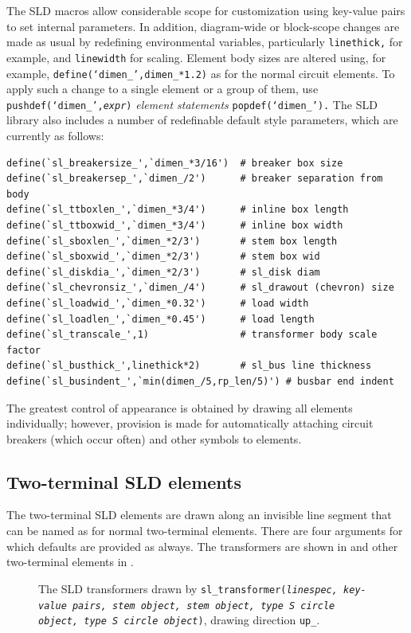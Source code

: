  The SLD macros allow considerable scope for
 customization using key-value pairs to set internal parameters.
 In addition, diagram-wide or block-scope changes are made as usual
 by redefining environmental variables, particularly
 {\tt linethick,} for example, and {\tt linewidth} for scaling.
 Element body sizes are altered using, for example,
 {\tt define(`dimen\_',dimen\_*1.2)} as for the normal circuit elements.
 To apply such a change to a single element or a group of them,
 use {\tt pushdef(`dimen\_',{\sl expr})} {\sl element statements}
 {\tt popdef(`dimen\_').} 
The SLD library also includes a number of redefinable default
style parameters, which are currently as follows:
\begin{verbatim}
define(`sl_breakersize_',`dimen_*3/16')  # breaker box size
define(`sl_breakersep_',`dimen_/2')      # breaker separation from body
define(`sl_ttboxlen_',`dimen_*3/4')      # inline box length
define(`sl_ttboxwid_',`dimen_*3/4')      # inline box width
define(`sl_sboxlen_',`dimen_*2/3')       # stem box length
define(`sl_sboxwid_',`dimen_*2/3')       # stem box wid
define(`sl_diskdia_',`dimen_*2/3')       # sl_disk diam
define(`sl_chevronsiz_',`dimen_/4')      # sl_drawout (chevron) size
define(`sl_loadwid_',`dimen_*0.32')      # load width
define(`sl_loadlen_',`dimen_*0.45')      # load length
define(`sl_transcale_',1)                # transformer body scale factor
define(`sl_busthick_',linethick*2)       # sl_bus line thickness
define(`sl_busindent_',`min(dimen_/5,rp_len/5)') # busbar end indent
\end{verbatim}

 The greatest control of appearance is obtained by drawing all
 elements individually; however,
 provision is made for automatically attaching circuit breakers
 (which occur often)
 and other symbols to elements.

\subsection{Two-terminal SLD elements\label{TwoTermSLD:}}
The two-terminal SLD elements are drawn along an invisible line segment
that can be named as for normal two-terminal elements.
There are four arguments for which defaults are provided as always.
The transformers are shown in  and other two-terminal
elements in .
\begin{figure}[H]
   \vspace*{-\baselineskip}
   \SLDTransformers
   \caption{The SLD transformers
     drawn by {\tt sl\_transformer({\sl linespec, key-value pairs,
     stem object, stem object, type {\tt S} circle object,
     type {\tt S} circle object})},
     drawing direction {\tt up\_}.}
   \label{SLDTransformers}
   \end{figure}

